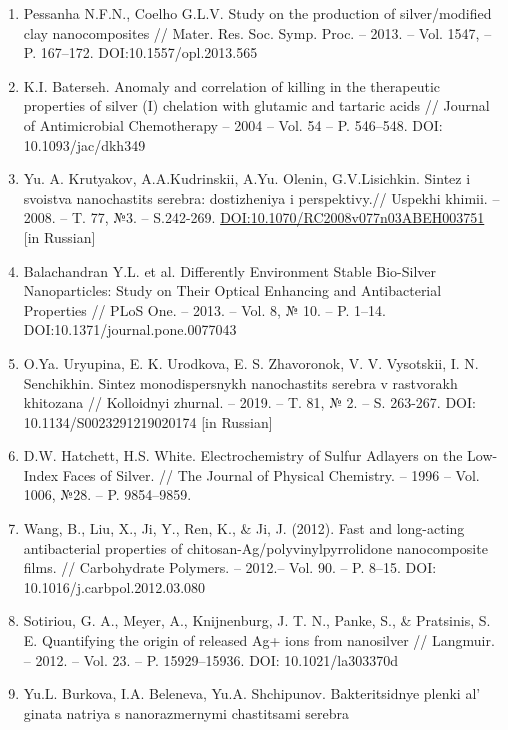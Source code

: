 \begin{references}
\begin{enumerate}
\def\labelenumi{\arabic{enumi}.}
\item
  Pessanha N.F.N., Coelho G.L.V. Study on the production of
  silver/modified clay nanocomposites // Mater. Res. Soc. Symp. Proc. --
  2013. -- Vol. 1547, -- P. 167--172. DOI:10.1557/opl.2013.565
\item
  K.I. Baterseh. Anomaly and correlation of killing in the therapeutic
  properties of silver (I) chelation with glutamic and tartaric acids //
  Journal of Antimicrobial Chemotherapy -- 2004 -- Vol. 54 -- P.
  546--548. DOI: 10.1093/jac/dkh349
\item
  Yu. A. Krutyakov, A.A.Kudrinskii, A.Yu. Olenin, G.V.Lisichkin. Sintez
  i svoistva nanochastits serebra: dostizheniya i perspektivy.// Uspekhi
  khimii. -- 2008. -- T. 77, №3. -- S.242-269.
  \href{https://doi.org/10.1070/RC2008v077n03ABEH003751}{DOI:10.1070/RC2008v077n03ABEH003751}
  {[}in Russian{]}
\item
  Balachandran Y.L. et al. Differently Environment Stable Bio-Silver
  Nanoparticles: Study on Their Optical Enhancing and Antibacterial
  Properties // PLoS One. -- 2013. -- Vol. 8, № 10. -- P. 1--14.
  DOI:10.1371/journal.pone.0077043
\item
  O.Ya. Uryupina, E. K. Urodkova, E. S. Zhavoronok, V. V. Vysotskii, I.
  N. Senchikhin. Sintez monodispersnykh nanochastits serebra v
  rastvorakh khitozana // Kolloidnyi zhurnal. -- 2019. -- T. 81, № 2. --
  S. 263-267. DOI: 10.1134/S0023291219020174 {[}in Russian{]}
\item
  D.W. Hatchett, H.S. White. Electrochemistry of Sulfur Adlayers on the
  Low-Index Faces of Silver. // The Journal of Physical Chemistry. --
  1996 -- Vol. 1006, №28. -- P. 9854--9859.
\item
  Wang, B., Liu, X., Ji, Y., Ren, K., \& Ji, J. (2012). Fast and
  long-acting antibacterial properties of
  chitosan-Ag/polyvinylpyrrolidone nanocomposite films. // Carbohydrate
  Polymers. -- 2012.-- Vol. 90. -- P. 8--15. DOI:
  10.1016/j.carbpol.2012.03.080
\item
  Sotiriou, G. A., Meyer, A., Knijnenburg, J. T. N., Panke, S., \&
  Pratsinis, S. E. Quantifying the origin of released Ag+ ions from
  nanosilver // Langmuir. -- 2012. -- Vol. 23. -- P. 15929--15936. DOI:
  10.1021/la303370d
\item
  Yu.L. Burkova, I.A. Beleneva, Yu.A. Shchipunov. Bakteritsidnye plenki
  al' ginata natriya s nanorazmernymi chastitsami serebra

\end{enumerate}
\end{references}
